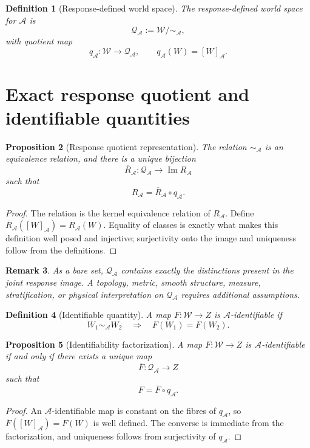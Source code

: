 \documentclass[11pt]{article}
\newtheorem{definition}{Definition}[section]
\newtheorem{proposition}[definition]{Proposition}
\newtheorem{remark}[definition]{Remark}
\newcommand{\W}{\mathcal W}
\newcommand{\Acal}{\mathcal A}
\newcommand{\QA}{\mathcal Q_{\mathcal A}}
\begin{document}
\begin{definition}[Response-defined world space]
The response-defined world space for $\Acal$ is
\[
\QA:=\W/\!\sim_{\Acal},
\]
with quotient map
\[
q_{\Acal}:\W\to\QA,
\qquad
q_{\Acal}(W)=[W]_{\Acal}.
\]
\end{definition}

\section{Exact response quotient and identifiable quantities}

\begin{proposition}[Response quotient representation]\label{prop:quotient}
The relation $\sim_{\Acal}$ is an equivalence relation, and there is a unique
bijection
\[
\overline R_{\Acal}:\QA\longrightarrow\operatorname{Im}R_{\Acal}
\]
such that
\[
R_{\Acal}=\overline R_{\Acal}\circ q_{\Acal}.
\]
\end{proposition}

\begin{proof}
The relation is the kernel equivalence relation of $R_{\Acal}$. Define
$\overline R_{\Acal}([W]_{\Acal})=R_{\Acal}(W)$. Equality of classes is exactly
what makes this definition well posed and injective; surjectivity onto the
image and uniqueness follow from the definitions.
\end{proof}

\begin{remark}
As a bare set, $\QA$ contains exactly the distinctions present in the joint
response image. A topology, metric, smooth structure, measure, stratification,
or physical interpretation on $\QA$ requires additional assumptions.
\end{remark}

\begin{definition}[Identifiable quantity]
A map $F:\W\to Z$ is \emph{$\Acal$-identifiable} if
\[
W_1\sim_{\Acal}W_2
\quad\Longrightarrow\quad
F(W_1)=F(W_2).
\]
\end{definition}

\begin{proposition}[Identifiability factorization]\label{prop:identifiable}
A map $F:\W\to Z$ is $\Acal$-identifiable if and only if there exists a unique
map
\[
\overline F:\QA\to Z
\]
such that
\[
F=\overline F\circ q_{\Acal}.
\]
\end{proposition}

\begin{proof}
An $\Acal$-identifiable map is constant on the fibres of $q_{\Acal}$, so
$\overline F([W]_{\Acal})=F(W)$ is well defined. The converse is immediate from
the factorization, and uniqueness follows from surjectivity of $q_{\Acal}$.
\end{proof}
\end{document}
